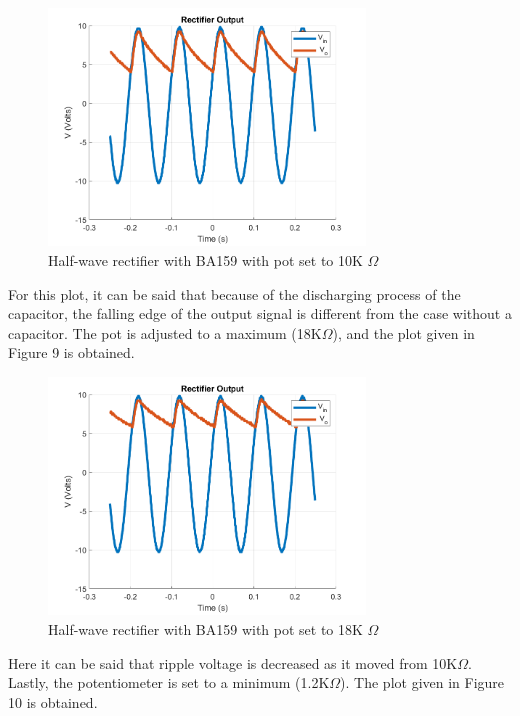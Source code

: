 \documentclass[letterpaper,12pt]{article}
\begin{document}
\begin{figure}[H]
    \centering
    \includegraphics[width = 0.75\textwidth]{2_b_POT_10K.png}
    \caption{Half-wave rectifier with BA159 with pot set to 10K \(\Omega\)}
\end{figure} 
For this plot, it can be said that because of the discharging process of the capacitor, the falling edge of the output signal is different from the case without a capacitor. 
The pot is adjusted to a maximum (18K\(\Omega\)), and the plot given in Figure 9 is obtained.
\begin{figure}[H]
    \centering
    \includegraphics[width = 0.75\textwidth]{2_b_POT_18K.png}
    \caption{Half-wave rectifier with BA159 with pot set to 18K \(\Omega\)}
\end{figure} 
Here it can be said that ripple voltage is decreased as it moved from 10K\(\Omega\).
Lastly, the potentiometer is set to a minimum (1.2K\(\Omega\)). The plot given in Figure 10 is obtained. 
\end{document}

